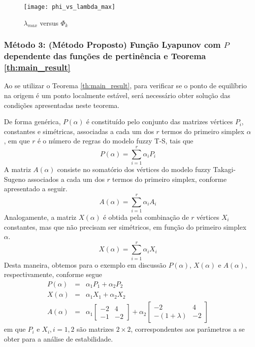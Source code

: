 \begin{figure}[htbp]
	\centering
	\texttt{[image: phi\_vs\_lambda\_max]}
	\caption{$\lambda_{max}$ versus $\Phi_k$}
	\label{fig:phi_k_vs_lambda_max}
\end{figure}

\subsubsection{Método 3: (Método Proposto) Função Lyapunov com $P$ dependente das funções de pertinência e Teorema \ref{th:main_result}}

Ao se utilizar o Teorema \ref{th:main_result}, para verificar se o ponto de equilíbrio na origem é um ponto localmente estável, será necessário obter solução das condições apresentadas neste teorema.

De forma genérica, $P(\alpha)$ é constituído pelo conjunto das matrizes vértices $P_i$, constantes e simétricas, associadas a cada um dos $r$ termos do primeiro simplex $\alpha$, em que $r$ é o número de regras do modelo fuzzy T-S, tais que
\begin{equation}\label{eq:P_alpha}
P(\alpha) = \sum_{i = 1}^{r}\alpha_iP_i
\end{equation}
A matriz $A(\alpha)$ consiste no somatório dos vértices do modelo fuzzy Takagi-Sugeno associados a cada um dos $r$ termos do primeiro simplex, conforme apresentado a seguir.
\begin{equation}\label{eq:A_alpha_eq}
A(\alpha) = \sum_{i = 1}^{r}\alpha_iA_i
\end{equation}
Analogamente, a matriz $X(\alpha)$ é obtida pela combinação de $r$ vértices $X_i$ constantes, mas que não precisam ser simétricos, em função do primeiro simplex $\alpha$.
\begin{equation}\label{eq:X_alpha}
X(\alpha) = \sum_{i = 1}^{r}\alpha_iX_i
\end{equation}
Desta maneira, obtemos para o exemplo em discussão $P(\alpha)$, $X(\alpha)$ e $A(\alpha)$, respectivamente, conforme segue
\begin{equation*}
\begin{array}{lcl}
P(\alpha) & = & \alpha_1P_1 + \alpha_2P_2\\
X(\alpha) & = & \alpha_1X_1 + \alpha_2X_2\\
A(\alpha) & = & \alpha_1\begin{bmatrix}-2&4\\-1&-2\end{bmatrix} + \alpha_2\begin{bmatrix}-2&4\\-(1+\lambda)&-2\end{bmatrix}
\end{array}
\end{equation*}
em que $P_i$ e $X_i, i = 1, 2$  são matrizes $2 \times 2$, correspondentes aos parâmetros a se obter para a análise de estabilidade.

